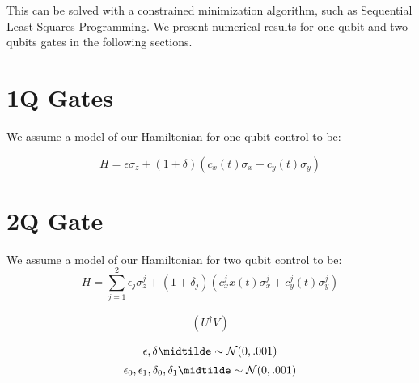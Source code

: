 \documentclass[aps,nofootinbib,pra,notitlepage,twocolumn]{revtex4-1}
\begin{document}
This can be solved with a constrained minimization algorithm, such as Sequential Least Squares Programming. We present numerical results for one qubit and two qubits gates in the following sections.

\section{1Q Gates}
We assume a model of our Hamiltonian for one qubit control to be:

$$ H = \epsilon\sigma_z + (1 + \delta)(c_x(t)\sigma_x + c_y(t)\sigma_y) $$

\section{2Q Gate}
We assume a model of our Hamiltonian for two qubit control to be:
$$H = \sum_{j=1}^2\epsilon_j\sigma_z^j + (1 + \delta_j)(c_x^jx(t)\sigma_x^j + c_y^j(t)\sigma_y^j)$$




\begin{align*}
    \left( U^\dagger V \right)
\end{align*}

$$ \epsilon, \delta \midtilde \sim \mathcal{N}(0, .001) $$
$$\epsilon_0, \epsilon_1, \delta_0, \delta_1 \midtilde \sim \mathcal{N}(0, .001)$$
% 
\end{document}

